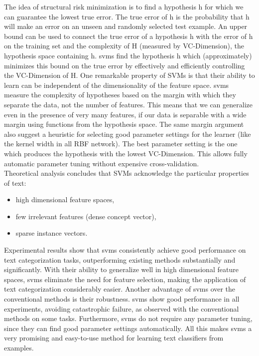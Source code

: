 The idea of structural risk minimization is to find a hypothesis h for which we can guarantee the lowest true error.  
The true error of h is the probability that h will make an error on an unseen and randomly selected test example. 
An upper bound can be used to connect the true error of a hypothesis h with the error of h on the training set and the complexity of H (measured by VC-Dimension), the hypothesis space containing h. 
\gls{svm}s find the hypothesis h which (approximately) minimizes this bound on the true error by effectively and efficiently controlling the VC-Dimension of H.
One remarkable property of SVMs is that their ability to learn can be independent of the dimensionality of the feature space. 
\gls{svm}s measure the complexity of hypotheses based on the margin with which they separate the data, not the number of features. 
This means that we can generalize even in the presence of very many features, if our data is separable with a wide margin using functions from the hypothesis space. 
The same margin argument also suggest a heuristic for selecting good parameter settings for the learner (like the kernel width in all RBF network). 
The best parameter setting is the one which produces the hypothesis with the lowest VC-Dimension.
This allows fully automatic parameter tuning without expensive cross-validation. \\
Theoretical analysis concludes that SVMs acknowledge the particular properties of text: 
\begin{itemize}
	\item high dimensional feature spaces, 
	\item few irrelevant features (dense concept vector), 
	\item sparse instance vectors.
\end{itemize}
Experimental results show that \gls{svm}s consistently achieve good performance on text categorization tasks, outperforming existing methods substantially and significantly. 
With their ability to generalize well in high dimensional feature spaces, \gls{svm}s eliminate the need for feature selection, making the application of text categorization considerably easier.
Another advantage of \gls{svm}s over the conventional methods is their robustness. 
\gls{svm}s show good performance in all experiments, avoiding catastrophic failure, as observed with the conventional methods on some tasks. 
Furthermore, \gls{svm}s do not require any parameter tuning, since they can find good parameter settings automatically. 
All this makes \gls{svm}s a very promising and easy-to-use method for learning text classifiers from examples.
\cite{Joachims1998}



